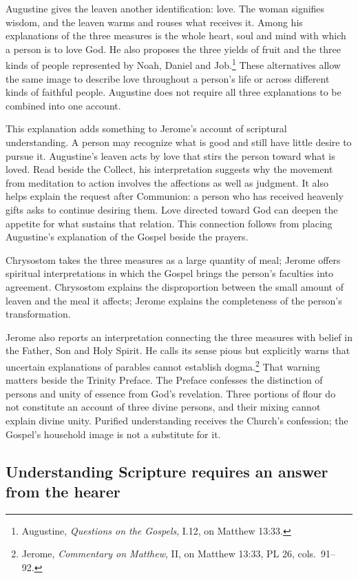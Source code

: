 Augustine gives the leaven another identification: love. The woman signifies wisdom, and the leaven warms and rouses what receives it. Among his explanations of the three measures is the whole heart, soul and mind with which a person is to love God. He also proposes the three yields of fruit and the three kinds of people represented by Noah, Daniel and Job.\footnote{Augustine, \textit{Questions on the Gospels}, I.12, on Matthew 13:33.} These alternatives allow the same image to describe love throughout a person's life or across different kinds of faithful people. Augustine does not require all three explanations to be combined into one account.

This explanation adds something to Jerome's account of scriptural understanding. A person may recognize what is good and still have little desire to pursue it. Augustine's leaven acts by love that stirs the person toward what is loved. Read beside the Collect, his interpretation suggests why the movement from meditation to action involves the affections as well as judgment. It also helps explain the request after Communion: a person who has received heavenly gifts asks to continue desiring them. Love directed toward God can deepen the appetite for what sustains that relation. This connection follows from placing Augustine's explanation of the Gospel beside the prayers.

Chrysostom takes the three measures as a large quantity of meal; Jerome offers spiritual interpretations in which the Gospel brings the person's faculties into agreement. Chrysostom explains the disproportion between the small amount of leaven and the meal it affects; Jerome explains the completeness of the person's transformation.

Jerome also reports an interpretation connecting the three measures with belief in the Father, Son and Holy Spirit. He calls its sense pious but explicitly warns that uncertain explanations of parables cannot establish dogma.\footnote{Jerome, \textit{Commentary on Matthew}, II, on Matthew 13:33, PL 26, cols.~91--92.} That warning matters beside the Trinity Preface. The Preface confesses the distinction of persons and unity of essence from God's revelation. Three portions of flour do not constitute an account of three divine persons, and their mixing cannot explain divine unity. Purified understanding receives the Church's confession; the Gospel's household image is not a substitute for it.

\subsection{Understanding Scripture requires an answer from the hearer}

